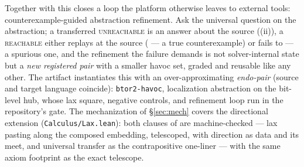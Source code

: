 Together with  this closes a loop
the platform otherwise leaves to external tools:
counterexample-guided abstraction refinement. Ask the universal
question on the abstraction; a transferred \textsc{unreachable} is an
answer about the source ((ii)), a \textsc{reachable}
either replays at the source ( --- a true
counterexample) or fails to --- a spurious one, and the refinement the
failure demands is not solver-internal state but a \emph{new
registered pair} with a smaller havoc set, graded and reusable like
any other. The artifact instantiates this with an over-approximating
\emph{endo-pair} (source and target language coincide):
\texttt{btor2-havoc}, localization abstraction on the bit-level hub,
whose lax square, negative controls, and refinement loop run in the
repository's gate. The mechanization of \S\ref{sec:mech} covers the
directional extension (\texttt{Calculus/Lax.lean}): both clauses of
 are machine-checked --- lax pasting along the composed
embedding, telescoped, with direction as data and its meet, and
universal transfer as the contrapositive one-liner --- with the same
axiom footprint as the exact telescope.
\fi
